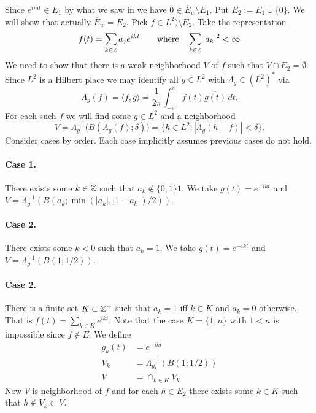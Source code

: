 \begin{enumerate}
\begin{itemize}
Since \(e^{imt} \in E_1\) by what we saw in  we have
\(0 \in \overline{E}_w\setminus E_1\).
Put \(E_2 := E_1 \cup \{0\}\).
We will show that actually \(\overline{E}_w = E_2\).
Pick
\(f\in L^2) \setminus E_2\). Take the representation
\begin{equation*}
f(t) = \sum_{k\in\mathbb{Z}} a_je^{ikt}
\qquad \textnormal{where}\quad
\sum_{k\in\mathbb{Z}} |a_k|^2 < \infty
\end{equation*}
We need to show that there is a weak neighborhood $V$ of $f$
such that \(V\cap E_2 = \emptyset\).
Since \(L^2\) is a Hilbert place
we may identify all \(g\in L^2\) with \(\Lambda_g\in (L^2)^*\)
via
\begin{equation*}
\Lambda_g(f) = \langle f, g\rangle
 = \frac{1}{2\pi} \int_{-\pi}^\pi f(t)\overline{g(t)}\,dt.
\end{equation*}
For each such $f$ we will find some \(g\in L^2\) and a neighborhood
\begin{equation*}
V = \Lambda_g^{-1}\bigl(B(\Lambda_g(f);\delta)\bigr)
  = \{h\in L^2: |\Lambda_g(h-f)| < \delta\}.
\end{equation*}
Consider cases by order.
Each case implicitly  assumes previous cases do not hold.
\paragraph{Case 1.} There exists some \(k\in\mathbb{Z}\) such that \(a_k\notin\{0,1\}1\).
We take \(g(t)=e^{-ikt}\) and
\(V = \Lambda_g^{-1}\left(B(a_k;\min(|a_k|,|1-a_k|)/2)\right)\).

\paragraph{Case 2.} There exists some \(k<0\) such that \(a_k=1\).
We take \(g(t)=e^{-ikt}\) and \(V = \Lambda_g^{-1}(B(1;1/2))\).

\paragraph{Case 2.} There is a finite set \(K\subset \mathbb{Z}^+\)
such that \(a_k = 1\) iff \(k\in K\) and \(a_k = 0\) otherwise.
That is \(f(t) = \sum_{k\in K} e^{ikt}\).
Note that the case \(K=\{1,n\}\) with \(1<n\) is impossible
since \(f\notin E\).
We define
\begin{align*}
g_k(t) &= e^{-ikt} \\
V_k &= \Lambda_{g_k}^{-1}(B(1;1/2)) \\
V &= \cap_{k\in K} V_k
\end{align*}
Now $V$ is neighborhood of $f$ and for each \(h\in E_2\)
there exists some \(k\in K\) such that \(h\notin V_k\subset V\).


\end{itemize}
\end{enumerate}
